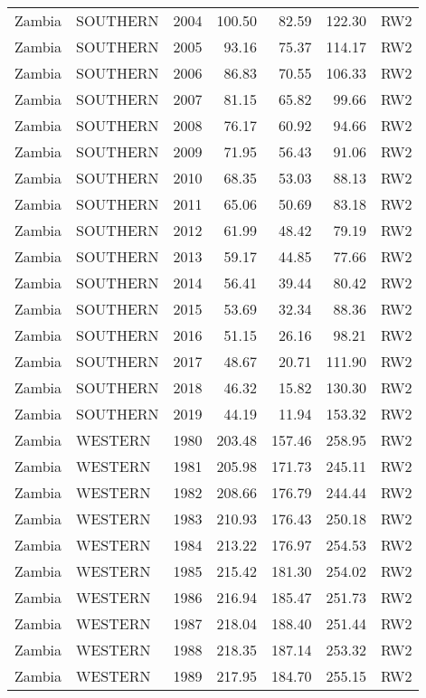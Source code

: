 \begin{longtable}{lllrrrl}
  Zambia & SOUTHERN & 2004 & 100.50 & 82.59 & 122.30 & RW2 \\ 
  Zambia & SOUTHERN & 2005 & 93.16 & 75.37 & 114.17 & RW2 \\ 
  Zambia & SOUTHERN & 2006 & 86.83 & 70.55 & 106.33 & RW2 \\ 
  Zambia & SOUTHERN & 2007 & 81.15 & 65.82 & 99.66 & RW2 \\ 
  Zambia & SOUTHERN & 2008 & 76.17 & 60.92 & 94.66 & RW2 \\ 
  Zambia & SOUTHERN & 2009 & 71.95 & 56.43 & 91.06 & RW2 \\ 
  Zambia & SOUTHERN & 2010 & 68.35 & 53.03 & 88.13 & RW2 \\ 
  Zambia & SOUTHERN & 2011 & 65.06 & 50.69 & 83.18 & RW2 \\ 
  Zambia & SOUTHERN & 2012 & 61.99 & 48.42 & 79.19 & RW2 \\ 
  Zambia & SOUTHERN & 2013 & 59.17 & 44.85 & 77.66 & RW2 \\ 
  Zambia & SOUTHERN & 2014 & 56.41 & 39.44 & 80.42 & RW2 \\ 
  Zambia & SOUTHERN & 2015 & 53.69 & 32.34 & 88.36 & RW2 \\ 
  Zambia & SOUTHERN & 2016 & 51.15 & 26.16 & 98.21 & RW2 \\ 
  Zambia & SOUTHERN & 2017 & 48.67 & 20.71 & 111.90 & RW2 \\ 
  Zambia & SOUTHERN & 2018 & 46.32 & 15.82 & 130.30 & RW2 \\ 
  Zambia & SOUTHERN & 2019 & 44.19 & 11.94 & 153.32 & RW2 \\ 
  Zambia & WESTERN & 1980 & 203.48 & 157.46 & 258.95 & RW2 \\ 
  Zambia & WESTERN & 1981 & 205.98 & 171.73 & 245.11 & RW2 \\ 
  Zambia & WESTERN & 1982 & 208.66 & 176.79 & 244.44 & RW2 \\ 
  Zambia & WESTERN & 1983 & 210.93 & 176.43 & 250.18 & RW2 \\ 
  Zambia & WESTERN & 1984 & 213.22 & 176.97 & 254.53 & RW2 \\ 
  Zambia & WESTERN & 1985 & 215.42 & 181.30 & 254.02 & RW2 \\ 
  Zambia & WESTERN & 1986 & 216.94 & 185.47 & 251.73 & RW2 \\ 
  Zambia & WESTERN & 1987 & 218.04 & 188.40 & 251.44 & RW2 \\ 
  Zambia & WESTERN & 1988 & 218.35 & 187.14 & 253.32 & RW2 \\ 
  Zambia & WESTERN & 1989 & 217.95 & 184.70 & 255.15 & RW2 \\ 

\end{longtable}
